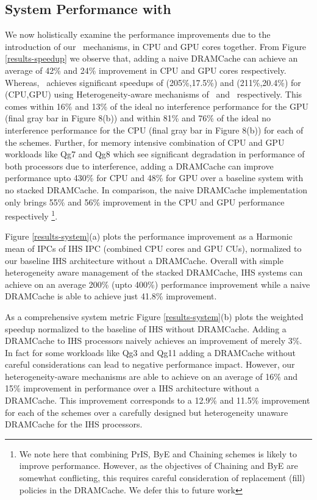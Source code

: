 \subsection{System Performance with \cachename}
We now holistically examine the performance improvements due to the introduction of our \cachename\ mechanisms, in  CPU and GPU cores together. From Figure \ref{results-speedup} we observe that, adding a naive DRAMCache can achieve an average of 42\% and 24\% improvement in CPU and GPU cores respectively. Whereas, \cachename\ achieves significant speedups of (205\%,17.5\%) and (211\%,20.4\%) for (CPU,GPU) using Heterogeneity-aware mechanisms of \bypassname\ and \chaining\ respectively. This comes within 16\% and 13\% of the ideal no interference performance for the GPU (final gray bar in Figure 8(b)) and within 81\% and 76\% of the ideal no interference performance for the CPU (final gray bar in Figure 8(b)) for each of the schemes. Further, for memory intensive combination of CPU and GPU workloads like Qg7 and Qg8 which see significant degradation in performance of both processors due to interference, adding a DRAMCache can improve performance upto 430\% for CPU and 48\% for GPU over a baseline system with no stacked DRAMCache. In comparison, the naive DRAMCache implementation only brings 55\% and 56\% improvement in the CPU and GPU performance respectively
\footnote{We note here that combining PrIS, ByE and Chaining schemes is likely to improve performance. However, as the objectives of Chaining and ByE are somewhat conflicting, this requires careful consideration of replacement (fill) policies in the DRAMCache. We defer this to future work}.
\par Figure \ref{results-system}(a) plots the performance improvement as a Harmonic mean of IPCs of IHS IPC (combined CPU cores and GPU CUs), normalized to our baseline IHS architecture without a DRAMCache. Overall with simple heterogeneity aware management of the stacked DRAMCache, IHS systems can achieve on an average 200\% (upto 400\%) performance improvement while a naive DRAMCache is able to achieve just 41.8\% improvement.
\par As a comprehensive system metric Figure \ref{results-system}(b) plots the weighted speedup normalized to the baseline of IHS without DRAMCache. Adding a DRAMCache to IHS processors naively achieves an improvement of merely 3\%. In fact for some workloads like Qg3 and Qg11 adding a DRAMCache without careful considerations can lead to negative performance impact. However, our heterogeneity-aware mechanisms are able to achieve on an average of 16\% and 15\%  improvement in performance over a IHS architecture without a DRAMCache. This improvement corresponds to a 12.9\% and 11.5\% improvement for each of the schemes over a carefully designed but heterogeneity unaware DRAMCache for the IHS processors.

